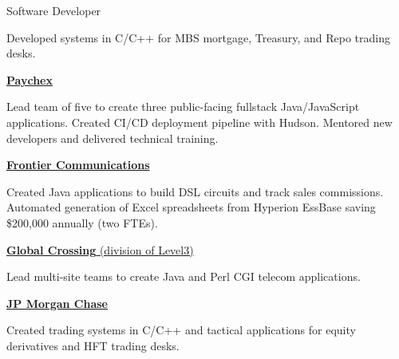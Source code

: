 \documentclass[letterpaper,MMMMyyyy,nonstopmode]{simpleresumecv}
\newcommand{\comment}[1]{\ignorespaces} %
\newif\ifLOCATION
\begin{document}
\begin{Body}
Software Developer
\ifLOCATION
\hfill
New York, New York
\fi

\begin{Detail}
\Item
Developed systems in C/C++ for MBS mortgage, Treasury, and Repo trading desks.
\end{Detail}

\iffalse
\BigGap
\Entry
\textbf{Prophet 21, Inc.}
\hfill 
Yardley, Pennsylvania

Associate Developer
\hfill
\DatestampYM{1992}{06} --  \DatestampYM{1993}{03}

\begin{Detail}
\BulletItem
Wrote and maintained features for point-of-sale systems targeted to retailers and wholesalers

\Gap
Technologies: Sybase, ksh
\end{Detail}
\fi

\else

\BigGap
\Entry
\href{http://www.paychex.com/}
{\textbf{Paychex}}

\begin{Detail}
\BulletItem
	Lead team of five to create three public-facing fullstack Java/JavaScript applications.
	Created CI/CD deployment pipeline with Hudson.
	Mentored new developers and delivered technical training.
\end{Detail}

\BigGap
\Entry
\href{http://www.frontier.com/}
{\textbf{Frontier Communications}}

\begin{Detail}
\BulletItem
Created Java applications to build DSL circuits and track sales commissions\comment{; CruiseControl used for Continuous Integration}.  Automated generation of \comment{20} Excel spreadsheets from Hyperion EssBase saving \$200,000 annually (two FTEs).
\end{Detail}

\BigGap
\Entry
\href{http://www.globalcrossing.com/}
{\textbf{Global  Crossing} (division of Level3)}

\begin{Detail}
\BulletItem
Lead multi-site teams to create Java and Perl CGI telecom applications.
\end{Detail}

\BigGap
\Entry
\href{http://www.jpmorganchase.com/}
{\textbf{JP Morgan Chase}}
\begin{Detail}
\BulletItem
Created trading systems in C/C++ and tactical applications for equity derivatives and HFT trading desks.
\end{Detail}


\end{Body}
\end{document}
